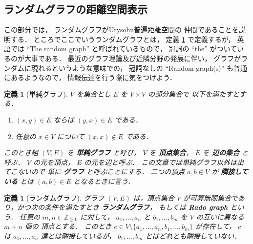 \documentclass[leqno, 12pt]{jsarticle}
\newtheorem{df}[thm]{定義}
\newcommand{\zz}{\mathbb{Z}}
\newcommand{\yozz}[1]{\zz_{\ge #1}}
\begin{document}
\subsection{ランダムグラフの距離空間表示}\label{subsec:discrete:random-graph}
この部分では，%
ランダムグラフがUrysohn普遍距離空間の
仲間であることを説明する．%
ところでここでいうランダムグラフとは，
定義
\ref{df:rand:randomgraph}
で定義するが，
英語では
``The random graph''
と呼ばれているもので，
冠詞の
``the''
がついているのが大事である．
最近のグラフ理論及び近隣分野の発展に伴い，
グラフがランダムに現れるというような意味での，
冠詞なしの
``Random graph(s)''
も普通にあるようなので，
情報伝達を行う際に気をつけよう．
\begin{df}[単純グラフ]\label{df:rand:graph}
$V$
を集合とし
$E$
を
$V\times V$
の部分集合で
以下を満たすとする．
\begin{enumerate}[label=\textup{(\arabic*)}]
\item
$(x, y)\in E$
ならば
$(y, x)\in E$
である．
\item
任意の
$x\in V$
について
$(x, x)\not\in E$
である．
\end{enumerate}
このとき組
$(V, E)$
を
\textbf{単純グラフ}
と呼び，
$V$
を
\textbf{頂点集合}，
$E$
を
\textbf{辺の集合}
と呼ぶ．
$V$
の元を頂点，
$E$
の元を辺と呼ぶ．
この文章では単純グラフ以外は出てこないので
単に
\textbf{グラフ}
と呼ぶことにする．
二つの頂点
$a, b\in V$
が
\textbf{隣接している}
とは
$(a, b)\in E$
となるときに言う．
\end{df}


\begin{df}[ランダムグラフ]\label{df:rand:randomgraph}
グラフ
$(V, E)$
は，頂点集合
$V$
が可算無限集合であり，かつ次の条件を満たすとき
\textbf{ランダムグラフ}，
もしくは
\textbf{Rado graph}
という．
任意の
$m, n\in \yozz{0}$
に対して，
$a_{1}, \dots, a_{n}$
と
$b_{1}, \dots, b_{m}$
を
$V$
の互いに異なる
$m+n$
個の
頂点とする．
このとき
$c\in V\setminus
\{a_{1},\dots,a_{n},b_{1},\dots,b_{m}\}$
が存在して，
$c$
は
$a_{1},\dots, a_{n}$
達とは隣接しているが，
$b_{1}, \dots, b_{m}$
とはどれとも隣接していない．
\end{df}
\end{document}
